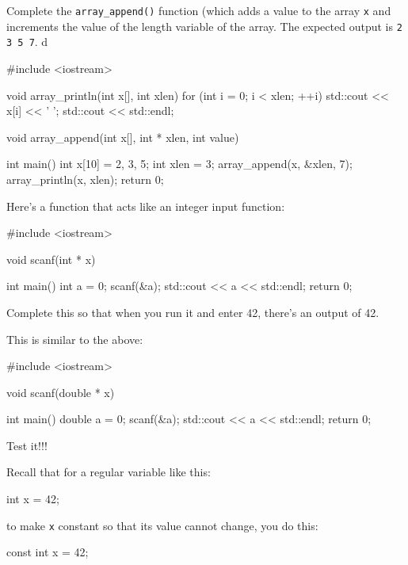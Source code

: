 \begin{ex}
Complete the \verb!array_append()! function (which adds a value to the array \verb!x! and increments the value of the length variable of the array. The expected output is \verb!2 3 5 7!.
d
\begin{consolethree}[escapeinside=||]
#include <iostream>

void array_println(int x[], int xlen)
{
    for (int i = 0; i < xlen; ++i)
    {
        std::cout << x[i] << ' ';
    }
    std::cout << std::endl;
}

void array_append(int x[], int * xlen, int value)
{
}

int main()
{
    int x[10] = {2, 3, 5};
    int xlen = 3;
    array_append(x, &xlen, 7);
    array_println(x, xlen);
    return 0;
}
\end{consolethree}
\end{ex}

\begin{ex}
Here's a function that acts like an integer input function:
\begin{consolethree}[escapeinside=||]
#include <iostream>

void scanf(int * x)
{
}

int main()
{
    int a = 0;
    scanf(&a);
    std::cout << a << std::endl;
    return 0;
}
\end{consolethree}
Complete this so that when you run it and enter 42, there's an output of 42.
\end{ex}
\begin{ex}
This is similar to the above:
\begin{consolethree}[escapeinside=||]
#include <iostream>

void scanf(double * x)
{
}

int main()
{
    double a = 0;
    scanf(&a);
    std::cout << a << std::endl;
    return 0;
}
\end{consolethree}
Test it!!!
\end{ex}

\newpage{}

Recall that for a regular variable like this:

\begin{consolethree}[escapeinside=||]
int x = 42;
\end{consolethree}

to make \texttt{x} constant so that its value cannot change, you do this:

\begin{consolethree}[escapeinside=||]
const int x = 42;
\end{consolethree}

